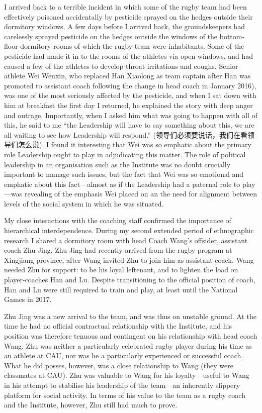 \begin{CJK}{UTF8}{gbsn}
I arrived back to a terrible incident in which some of the rugby team had been effectively poisoned accidentally by pesticide sprayed on the hedges outside their dormitory windows.  A few days before I arrived back, the groundskeepers had carelessly sprayed pesticide on the hedges outside the windows of the bottom-floor dormitory rooms of which the rugby team were inhabitants.  Some of the pesticide had made it in to the rooms of the athletes via open windows, and had caused a few of the athletes to develop throat irritations and coughs.
Senior athlete Wei Wenxin, who replaced Han Xiaolong as team captain after Han was promoted to assistant coach following the change in head coach in January 2016), was one of the most seriously affected by the pesticide, and when I sat down with him at breakfast the first day I returned, he explained the story with deep anger and outrage.  Importantly, when I asked him what was going to happen with all of this, he said to me ``the Leadership will have to say something about this, we are all waiting to see how Leadership will respond.'' (领导们必须要说话，我们在看领导们怎么说).  I found it interesting that Wei was so emphatic about the primary role Leadership ought to play in adjudicating this matter.  The role of political leadership in an organisation such as the Institute was no doubt crucially important to manage such issues, but the fact that Wei was so emotional and emphatic about this fact---almost as if the Leadership had a paternal role to play---was revealing of the emphasis Wei placed on an the need for alignment between levels of the social system in which he was situated.

My close interactions with the coaching staff confirmed the importance of hierarchical interdependence.  During my second extended period of ethnographic research I shared a dormitory room with head Coach Wang's offsider, assistant coach Zhu Jing.  Zhu Jing had recently arrived from the rugby program at Xingjiang province, after Wang invited Zhu to join him as assistant coach.   Wang needed Zhu for support: to be his loyal leftenant, and to lighten the load on player-coaches Han and Lu. Despite transitioning to the official position of coach, Han and Lu were still required to train and play, at least until the National Games in 2017.

Zhu Jing was a new arrival to the team, and was thus on unstable ground. At the time he had no official contractual relationship with the Institute, and his position was therefore tenuous and contingent on his relationship with head coach Wang.  Zhu was neither a particularly celebrated rugby player during his time as an athlete at CAU, nor was he a particularly experienced or successful coach.  What he did posses, however, was a close relationship to Wang (they were classmates at CAU). Zhu was valuable to Wang for his loyalty---useful to Wang in his attempt to stabilise his leadership of the team---an inherently slippery platform for social activity. In terms of his value to the team as a rugby coach and the Institute, however, Zhu still had much to prove.


\end{CJK}
